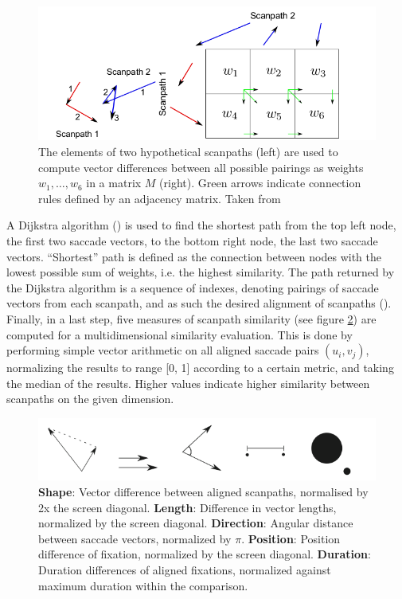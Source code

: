 \documentclass[a4paper, 12pt]{scrreprt}
\begin{document}
\begin{figure}
	\includegraphics[scale=0.4]{img/weightedgraph.png}
	\caption[Scanpath alignment as a shortest-path problem.]
	{\small{The elements of two hypothetical scanpaths (left) are used to compute vector differences between all possible pairings as weights $w_1, \ldots, w_6$ in a matrix $M$ (right). Green arrows indicate connection rules defined by an adjacency matrix. Taken from \textcite{jarodzka2010vector}}}
	\label{fig:directedgraph}
\end{figure}

A Dijkstra algorithm (\cite{dijkstra1959note}) is used to find the shortest path from the top left node, the first two saccade vectors, to the bottom right node, the last two saccade vectors. “Shortest” path is defined as the connection between nodes with the lowest possible sum of weights, i.e. the highest similarity. The path returned by the Dijkstra algorithm is a sequence of indexes, denoting pairings of saccade vectors from each scanpath, and as such the desired alignment of scanpaths (\cite{dewhurst2012depends}).  Finally, in a last step, five measures of scanpath similarity (see figure \ref{fig:simmeasures}) are computed for a multidimensional similarity evaluation. This is done by performing simple vector arithmetic on all aligned saccade pairs $(u_i, v_j)$, normalizing the results to range [0, 1] according to a certain metric, and taking the median of the results. Higher values indicate higher similarity between scanpaths on the given dimension. \newline

\begin{figure}[H]
	\includegraphics[scale=0.5]{img/simmeasures.png}
	\caption[Similarity measures]{\small{\textbf{Shape}: Vector difference between aligned scanpaths, normalised by 2x the screen diagonal. \textbf{Length}: Difference in vector lengths, normalized by the screen diagonal. \textbf{Direction}: Angular distance between saccade vectors, normalized by $\pi$. \textbf{Position}: Position difference of fixation, normalized by the screen diagonal. \textbf{Duration}: Duration differences of aligned fixations, normalized against maximum duration within the comparison.}}
	\label{fig:simmeasures}
\end{figure}
\end{document}
